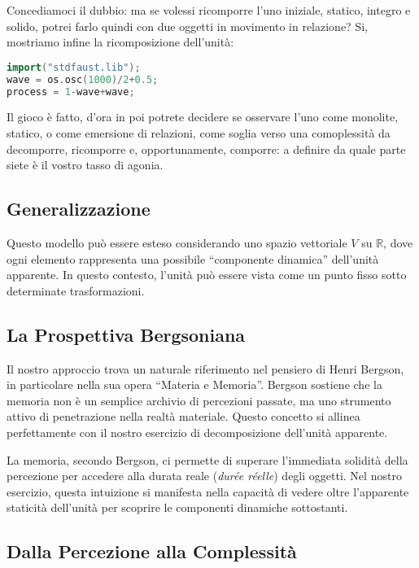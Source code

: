 \documentclass{gs-adonis}
\begin{document}
Concediamoci il dubbio: ma se volessi ricomporre l'uno iniziale,
statico, integro e solido, potrei farlo quindi con due oggetti in
movimento in relazione? Si, mostriamo infine la ricomposizione
dell'unità:

\begin{lstlisting}[language={C++}]
import("stdfaust.lib");
wave = os.osc(1000)/2+0.5;
process = 1-wave+wave;
\end{lstlisting}

Il gioco è fatto, d'ora in poi potrete decidere se osservare l'uno come
monolite, statico, o come emersione di relazioni, come soglia verso una
comoplessità da decomporre, ricomporre e, opportunamente, comporre: a
definire da quale parte siete è il vostro tasso di agonia.

\subsection{Generalizzazione}\label{generalizzazione}

Questo modello può essere esteso considerando uno spazio vettoriale
\(V\) su \(\mathbb{R}\), dove ogni elemento rappresenta una possibile
``componente dinamica'' dell'unità apparente. In questo contesto,
l'unità può essere vista come un punto fisso sotto determinate
trasformazioni.

\subsection{La Prospettiva
Bergsoniana}\label{la-prospettiva-bergsoniana}

Il nostro approccio trova un naturale riferimento nel pensiero di Henri
Bergson, in particolare nella sua opera ``Materia e Memoria''. Bergson
sostiene che la memoria non è un semplice archivio di percezioni
passate, ma uno strumento attivo di penetrazione nella realtà materiale.
Questo concetto si allinea perfettamente con il nostro esercizio di
decomposizione dell'unità apparente.

La memoria, secondo Bergson, ci permette di superare l'immediata
solidità della percezione per accedere alla durata reale (\emph{durée
réelle}) degli oggetti. Nel nostro esercizio, questa intuizione si
manifesta nella capacità di vedere oltre l'apparente staticità
dell'unità per scoprire le componenti dinamiche sottostanti.

\subsection{Dalla Percezione alla
Complessità}\label{dalla-percezione-alla-complessituxe0}
\end{document}
